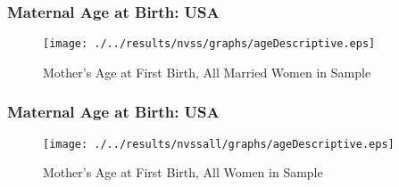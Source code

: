 \documentclass[10pt,letterpaper,subeqn]{beamer}
\begin{document}
\begin{frame}[label=ageHist]
\frametitle{Maternal Age at Birth: USA}
\begin{figure}[htpb!]
\begin{center}
  \centering
  \caption{Mother's Age at First Birth, All Married Women in Sample}
  \texttt{[image: ./../results/nvss/graphs/ageDescriptive.eps]}
  \label{fig:NVSSbirths}
\end{center}
\end{figure}
\vspace{-5mm}
\end{frame}

\begin{frame}[label=ageHist2]
\frametitle{Maternal Age at Birth: USA}
\begin{figure}[htpb!]
\begin{center}
  \centering
  \caption{Mother's Age at First Birth, All Women in Sample}
  \texttt{[image: ./../results/nvssall/graphs/ageDescriptive.eps]}
  \label{fig:NVSSbirthsAll}
\end{center}
\end{figure}
\vspace{-5mm}
\hyperlink{Data}{}
\end{frame}
\end{document}
